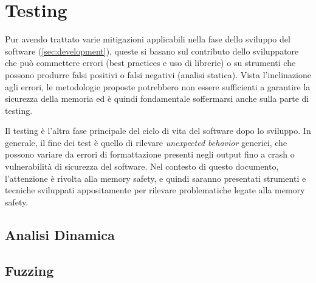 \section{Testing}
\label{sec:testing}

Pur avendo trattato varie mitigazioni applicabili nella fase dello sviluppo del software
(\autoref{sec:development}), queste si basano sul contributo dello sviluppatore
che può commettere errori (best practices e uso di librerie) o su strumenti che
possono produrre falsi positivi o falsi negativi (analisi statica). Vista l'inclinazione
agli errori, le metodologie proposte potrebbero non essere sufficienti a
garantire la sicurezza della memoria ed è quindi fondamentale soffermarsi anche
sulla parte di testing.

Il testing è l'altra fase principale del ciclo di vita del software dopo lo
sviluppo. In generale, il fine dei test è quello di rilevare \textit{unexpected
behavior} generici, che possono variare da errori di formattazione presenti
negli output fino a crash o vulnerabilità di sicurezza del software. Nel contesto
di questo documento, l'attenzione è rivolta alla memory safety, e quindi saranno
presentati strumenti e tecniche sviluppati appositamente per rilevare problematiche
legate alla memory safety.

\subsection{Analisi Dinamica}
\label{sec:analisi-dinamica}

\subsection{Fuzzing}
\label{sec:fuzzing}
